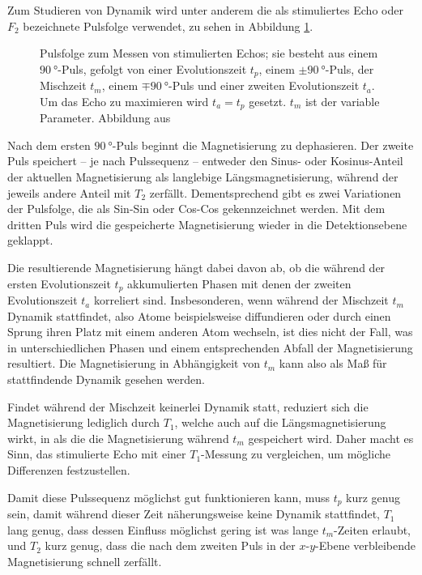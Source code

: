 Zum Studieren von Dynamik wird unter anderem die als stimuliertes Echo oder $F_2$ bezeichnete Pulsfolge verwendet, zu sehen in Abbildung \ref{fig:theo:pulsF2}.
\begin{figure}
	\begin{center}
		
	\end{center}
	\caption{Pulsfolge zum Messen von stimulierten Echos; sie besteht aus einem $\SI{90}{\degree}$-Puls, gefolgt von einer Evolutionszeit $t_p$, einem $\pm \SI{90}{\degree}$-Puls, der Mischzeit $t_m$, einem $\mp \SI{90}{\degree}$-Puls und einer zweiten Evolutionszeit $t_a$. Um das Echo zu maximieren wird $t_a = t_p$ gesetzt. $t_m$ ist der variable Parameter. Abbildung aus \cite{joachim_master}}\label{fig:theo:pulsF2}
\end{figure}

Nach dem ersten $\SI{90}{\degree}$-Puls beginnt die Magnetisierung zu dephasieren. Der zweite Puls speichert -- je nach Pulssequenz -- entweder den Sinus- oder Kosinus-Anteil der aktuellen Magnetisierung als langlebige Längsmagnetisierung, während der jeweils andere Anteil mit $T_2$ zerfällt. Dementsprechend gibt es zwei Variationen der Pulsfolge, die als Sin-Sin oder Cos-Cos gekennzeichnet werden. Mit dem dritten Puls wird die gespeicherte Magnetisierung wieder in die Detektionsebene geklappt. 

Die resultierende Magnetisierung hängt dabei davon ab, ob die während der ersten Evolutionszeit $t_p$ akkumulierten Phasen mit denen der zweiten Evolutionszeit $t_a$ korreliert sind. Insbesonderen, wenn während der Mischzeit $t_m$ Dynamik stattfindet, also Atome beispielsweise diffundieren oder durch einen Sprung ihren Platz mit einem anderen Atom wechseln, ist dies nicht der Fall, was in unterschiedlichen Phasen und einem entsprechenden Abfall der Magnetisierung resultiert. Die Magnetisierung in Abhängigkeit von $t_m$ kann also als Maß für stattfindende Dynamik gesehen werden.

Findet während der Mischzeit keinerlei Dynamik statt, reduziert sich die Magnetisierung lediglich durch $T_1$, welche auch auf die Längsmagnetisierung wirkt, in als die die Magnetisierung während $t_m$ gespeichert wird. Daher macht es Sinn, das stimulierte Echo mit einer $T_1$-Messung zu vergleichen, um mögliche Differenzen festzustellen.

Damit diese Pulssequenz möglichst gut funktionieren kann, muss $t_p$ kurz genug sein, damit während dieser Zeit näherungsweise keine Dynamik stattfindet, $T_1$ lang genug, dass dessen Einfluss möglichst gering ist was lange $t_m$-Zeiten erlaubt, und $T_2$ kurz genug, dass die nach dem zweiten Puls in der $x$-$y$-Ebene verbleibende Magnetisierung schnell zerfällt.

